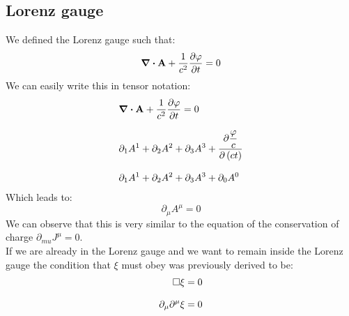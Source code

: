 \subsection{Lorenz gauge}
We defined the Lorenz gauge such that:
\begin{equation}
  \div{\vec{A}} +\dfrac{1}{c^2}\pdv{\potE}{t} = 0
\end{equation}
We can easily write this in tensor notation:
\begin{equation}
  \begin{split}
    &\div{\vec{A}} +\dfrac{1}{c^2}\pdv{\potE}{t} = 0 \\[8pt]
    &\partial_1A^1 + \partial_2A^2 + \partial_3A^3 +\pdv{\dfrac{\potE}{c}}{\brackets{ct}} \\[8pt]
    &\partial_1A^1 + \partial_2A^2 + \partial_3A^3 + \partial_0A^0
  \end{split}
\end{equation}
Which leads to:
\begin{equation}
  \boxed{\partial_{\mu}A^{\mu} = 0}
\end{equation}
We can observe that this is very similar to the equation of the conservation of charge $\partial_{mu}J^{\mu} = 0$.\\
If we are already in the Lorenz gauge and we want to remain inside the Lorenz gauge the condition that $\xi$ must obey was previously derived to be:
\begin{equation}
  \begin{split}
    \square \xi = 0 \\[8pt]
    \partial_{\mu}\partial^{\mu}\xi = 0
  \end{split}
\end{equation}
